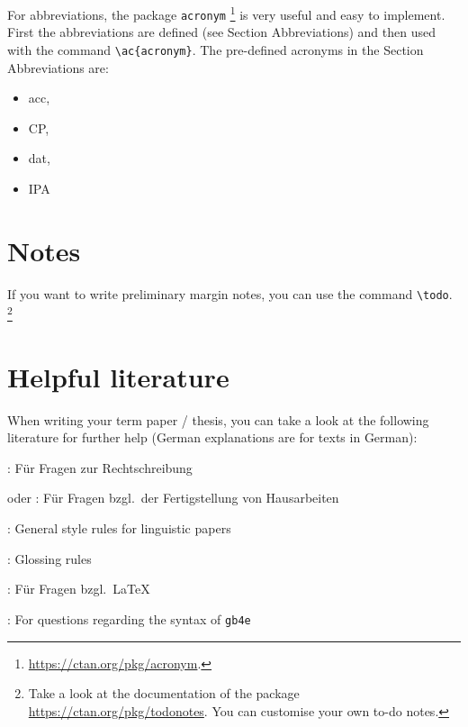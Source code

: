 For abbreviations, the package \texttt{acronym}%
%
\footnote{\url{https://ctan.org/pkg/acronym}.} %
%
is very useful and easy to implement. First the abbreviations are defined (see Section Abbreviations) and then used with the command \verb|\ac{acronym}|.  The pre-defined acronyms in the Section Abbreviations are: 

\begin{itemize}
\item \ac{acc}, 
\item \ac{CP}, 
\item \ac{dat},  
\item \ac{IPA} 
\end{itemize}


\section{Notes}
\label{ch:Notes}


If you want to write preliminary margin notes,  you can use the command \verb|\todo|.%
	\footnote{Take a look at the documentation of the package \url{https://ctan.org/pkg/todonotes}. You can customise your own to-do notes.} %


\section{Helpful literature}
\label{ch:HelpLiterature}


When writing your term paper / thesis, you can take a look at the following literature for further help (German explanations are for texts in German):


\begin{itemize*}
	\item \citet{DR17a}: Für Fragen zur Rechtschreibung 
	
	\item \citet{MyP17c} oder \citet{Rothstein11a}: Für Fragen bzgl.\ der Fertigstellung von Hausarbeiten
	
	\item \citet{Haspelmath14a}: General style rules for linguistic papers
	
	\item \citet{LeipzigGloss15a}: Glossing rules
	
	\item \citet{Freitag&MyP15a}: Für Fragen bzgl.\ \LaTeX\
	
	\item \citet{Kolb&Co10a}: For questions regarding the syntax of \texttt{gb4e}
	
\end{itemize*}
